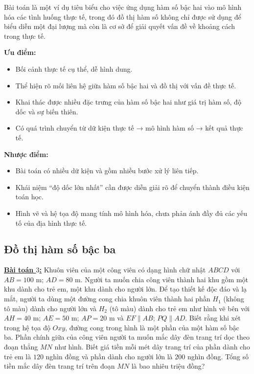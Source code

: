 \documentclass[12pt,a4paper,oneside]{book}
\theoremstyle{theorem}
\theoremstyle{definition}
\begin{document}
       Bài toán là một ví dụ tiêu biểu cho việc ứng dụng hàm số bậc hai vào mô hình hóa các tình huống thực tế, trong đó đồ thị hàm số không chỉ được sử dụng để biểu diễn một đại lượng mà còn là cơ sở để giải quyết vấn đề về khoảng cách trong thực tế.
        
        \textbf{Ưu điểm:}
        \begin{itemize}
            \item Bối cảnh thực tế cụ thể, dễ hình dung.
            \item Thể hiện rõ mối liên hệ giữa hàm số bậc hai và đồ thị với vấn đề thực tế.
            \item Khai thác được nhiều đặc trưng của hàm số bậc hai như giá trị hàm số, độ dốc và sự biến thiên.
            \item Có quá trình chuyển từ dữ kiện thực tế → mô hình hàm số → kết quả thực tế.
        \end{itemize}
        
        \textbf{Nhược điểm:}
        \begin{itemize}
            \item Bài toán có nhiều dữ kiện và gồm nhiều bước xử lý liên tiếp.
            \item Khái niệm “độ dốc lớn nhất” cần được diễn giải rõ để chuyển thành điều kiện toán học.
            \item Hình vẽ và hệ tọa độ mang tính mô hình hóa, chưa phản ánh đầy đủ các yếu tố của địa hình thực tế.
        \end{itemize}
    \subsection{Đồ thị hàm số bậc ba}
     \textbf{\underline{Bài toán $3$:}}
        Khuôn viên của một công viên có dạng hình chữ nhật $ABCD$ với $AB = 100\text{ m}$; $AD = 80\text{ m}$. Người ta muốn chia công viên thành hai khu gồm một khu dành cho trẻ em, một khu dành cho người lớn. Để tạo thiết kế độc đáo và lạ mắt, người ta dùng một đường cong chia khuôn viên thành hai phần $H_1$ (không tô màu) dành cho người lớn và $H_2$ (tô màu) dành cho trẻ em như hình vẽ bên với $AH = 40\text{ m}$; $AE = 50\text{ m}$; $AP = 20\text{ m}$ và $EF \parallel AB$; $PQ \parallel AD$. Biết rằng khi xét trong hệ tọa độ $Oxy$, đường cong trong hình là một phần của một hàm số bậc ba. Phần chính giữa của công viên người ta muốn mắc dây đèn trang trí dọc theo đoạn thẳng $MN$ như hình. Biết giá tiền mỗi mét dây trang trí của phần dành cho trẻ em là $120$ nghìn đồng và phần dành cho người lớn là $200$ nghìn đồng. Tổng số tiền mắc dây đèn trang trí trên đoạn $MN$ là bao nhiêu triệu đồng?
       
\end{document}
